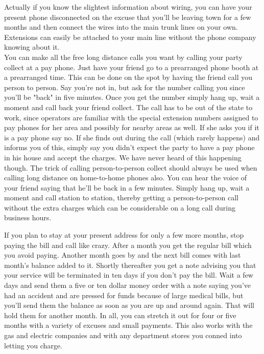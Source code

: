 \documentclass[11pt,twoside,a4paper]{book}
\begin{document}
Actually  if you know the slightest information about wiring, you can have your present phone disconnected on the excuse that you'll be leaving town for a few months and then connect the wires into the main trunk lines on your own. Extensions can easily be attached to your main line without the phone company knowing about it.~\\

You can make all the free long distance calls you want by calling your party collect at a pay phone. Just have your friend go to a prearranged phone booth at a prearranged time. This can be done on the spot by having the friend call you person to person. Say you're not in, but ask for the number calling you since you'll be "back" in five minutes. Once you get the number simply hang up, wait a moment and call back your friend collect. The call has to be out of the state to work, since operators are familiar with the special extension numbers assigned to pay phones for her area and possibly for nearby areas as well. If she asks you if it is a pay phone say no. If she finds out during the call (which rarely happens) and informs you of this, simply say you didn't expect the party to have a pay phone in his house and accept the charges. We have never heard of this happening though. The trick of calling person-to-person collect should always be used when calling long distance on home-to-home phones also. You can hear the voice of your friend saying that he'll be back in a few minutes. Simply hang up, wait a moment and call station to station, thereby getting a person-to-person call without the extra charges which can be considerable on a long call during business hours.~\\

\clearpage

If you plan to stay at your present address for only a few more months, stop paying the bill and call like crazy. After a month you get the regular bill which you avoid paying. Another month goes by and the next bill comes with last month's balance added to it. Shortly thereafter you get a note advising you that your service will be terminated in ten days if you don't pay the bill. Wait a few days and send them a five or ten dollar money order with a note saying you've had an accident and are pressed for funds because of large medical bills, but you'll send them the balance as soon as you are up and around again. That will hold them for another month. In all, you can stretch it out for four or five months with a variety of excuses and small payments. This also works with the gas and electric companies and with any department stores you conned into letting you charge.~\\
\end{document}
